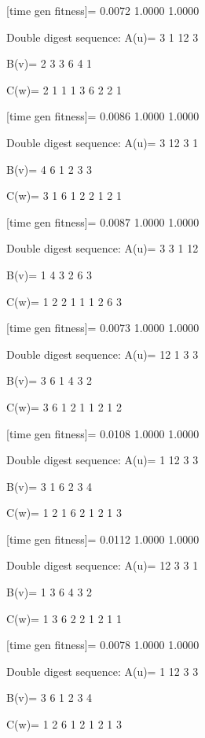 [time gen fitness]=
    0.0072    1.0000    1.0000

Double digest sequence:
A(u)=
     3     1    12     3

B(v)=
     2     3     3     6     4     1

C(w)=
     2     1     1     1     3     6     2     2     1

[time gen fitness]=
    0.0086    1.0000    1.0000

Double digest sequence:
A(u)=
     3    12     3     1

B(v)=
     4     6     1     2     3     3

C(w)=
     3     1     6     1     2     2     1     2     1

[time gen fitness]=
    0.0087    1.0000    1.0000

Double digest sequence:
A(u)=
     3     3     1    12

B(v)=
     1     4     3     2     6     3

C(w)=
     1     2     2     1     1     1     2     6     3

[time gen fitness]=
    0.0073    1.0000    1.0000

Double digest sequence:
A(u)=
    12     1     3     3

B(v)=
     3     6     1     4     3     2

C(w)=
     3     6     1     2     1     1     2     1     2

[time gen fitness]=
    0.0108    1.0000    1.0000

Double digest sequence:
A(u)=
     1    12     3     3

B(v)=
     3     1     6     2     3     4

C(w)=
     1     2     1     6     2     1     2     1     3

[time gen fitness]=
    0.0112    1.0000    1.0000

Double digest sequence:
A(u)=
    12     3     3     1

B(v)=
     1     3     6     4     3     2

C(w)=
     1     3     6     2     2     1     2     1     1

[time gen fitness]=
    0.0078    1.0000    1.0000

Double digest sequence:
A(u)=
     1    12     3     3

B(v)=
     3     6     1     2     3     4

C(w)=
     1     2     6     1     2     1     2     1     3

